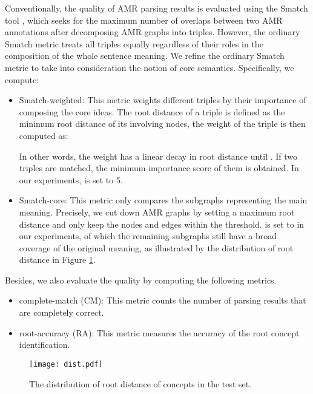 \documentclass[11pt,a4paper]{article}
\begin{document}
	Conventionally, the quality of AMR parsing results is evaluated using the Smatch tool \cite{cai2013smatch}, which seeks for the maximum number of overlaps between two AMR annotations after decomposing AMR graphs into triples. However, the ordinary Smatch metric treats all triples equally regardless of their roles in the composition of the whole sentence meaning. We refine the ordinary Smatch metric to take into consideration the notion of core semantics. Specifically, we compute:
	\begin{itemize}
		\item Smatch-weighted: This metric weights different triples by their importance of composing the core ideas. The root distance  of a triple is defined as the minimum root distance of its involving nodes, the weight of the triple is then computed as:
		
		In other words, the weight has a linear decay in root distance until . If two triples are matched, the minimum importance score of them is obtained. In our experiments,  is set to 5. 
		\item Smatch-core: This metric only compares the subgraphs representing the main meaning. Precisely, we cut down AMR graphs by setting a maximum root distance  and only keep the nodes and edges within the threshold.  is set to  in our experiments, of which the remaining subgraphs still have a broad coverage of the original meaning, as illustrated by the distribution of root distance in Figure \ref{dist}.
	\end{itemize}
	Besides, we also evaluate the quality by computing the following metrics.
	\begin{itemize}
		\item complete-match (CM): This metric counts the number of parsing results that are completely correct.
		\item root-accuracy (RA): This metric measures the accuracy of the root concept identification.
	\end{itemize}
\begin{figure}[t]
	\centering
	\texttt{[image: dist.pdf]}
	\caption{The distribution of root distance of concepts in the test set.}
	\label{dist}
\end{figure} 
\end{document}
